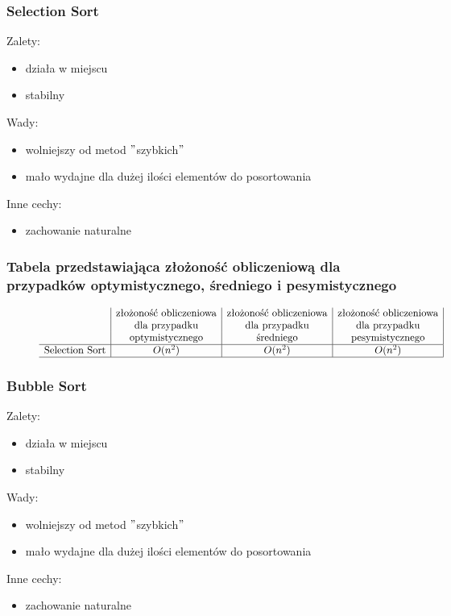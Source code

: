 \documentclass[polish,polish,a4paper]{article}
\begin{document}
\begin{spacing}{1.5}
		\subsubsection*{Selection Sort}
	Zalety:
	\begin{itemize}
		\item działa w miejscu
		\item stabilny 
	\end{itemize}
	Wady:
	\begin{itemize}
		\item wolniejszy od metod $ " $szybkich$ " $
		\item mało wydajne dla dużej ilości elementów do posortowania
	\end{itemize}
	Inne cechy:
	\begin{itemize}
		\item zachowanie naturalne
	\end{itemize}
	
				\subsubsection*{Tabela przedstawiająca złożoność obliczeniową dla przypadków optymistycznego, średniego i pesymistycznego} 
	\begin{figure}[H]

		\begin{equation*}
		\begin{array}{l|c|c|c|}

		&$złożoność obliczeniowa$&$złożoność obliczeniowa$&$złożoność obliczeniowa$\\
		&$dla przypadku$&$dla przypadku$&$dla przypadku$\\
		&$optymistycznego$&$średniego$&$pesymistycznego$\\
		\hline
		$Selection Sort$&O(n^2)&O(n^2)&O(n^2)\\
		\hline
		\end{array}
		\end{equation*}
	\end{figure}
	
	
			\subsubsection*{Bubble Sort}
	Zalety:
	\begin{itemize}
		\item działa w miejscu
		\item stabilny 
	\end{itemize}
	Wady:
	\begin{itemize}
		\item wolniejszy od metod $ " $szybkich$ " $
		\item mało wydajne dla dużej ilości elementów do posortowania
	\end{itemize}
	Inne cechy:
	\begin{itemize}
		\item zachowanie naturalne
	\end{itemize}
	

\end{spacing}
\end{document}

